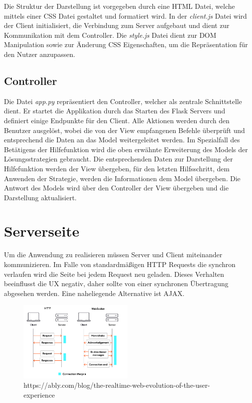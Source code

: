 Die Struktur der Darstellung ist vorgegeben durch eine \ac{HTML} Datei, welche mittels einer \ac{CSS} Datei gestaltet und formatiert wird. In der \textit{client.js} Datei wird der Client initialisiert, die Verbindung zum Server aufgebaut und dient zur Kommunikation mit dem Controller. Die \textit{style.js} Datei dient zur DOM Manipulation sowie zur Änderung \ac{CSS} Eigenschaften, um die Repräsentation für den Nutzer anzupassen.

\subsection{Controller}
Die Datei \textit{app.py} repräsentiert den Controller, welcher als zentrale Schnittstelle dient. Er startet die Applikation durch das Starten des Flask Servers und definiert einige Endpunkte für den Client. Alle Aktionen werden durch den Benutzer ausgelöst, wobei die von der View empfangenen Befehle überprüft und entsprechend die Daten an das Model weitergeleitet werden. Im Spezialfall des Betätigens der Hilfefunktion wird die oben erwähnte Erweiterung des Models der Lösungsstrategien gebraucht. Die entsprechenden Daten zur Darstellung der Hilfefunktion werden der View übergeben, für den letzten Hilfsschritt, dem Anwenden der Strategie, werden die Informationen dem Model übergeben. Die Antwort des Models wird über den Controller der View übergeben und die Darstellung aktualisiert. 

\section{Serverseite}

Um die Anwendung zu realisieren müssen Server und Client miteinander kommunizieren. Im Falle von standardmäßigen \ac{HTTP} Requests die synchron verlaufen wird die Seite bei jedem Request neu geladen. Dieses Verhalten beeinflusst die \ac{UX} negativ, daher sollte von einer synchronen Übertragung abgesehen werden. Eine naheliegende Alternative ist \ac{AJAX}. 

\begin{figure}[htbp]
	\centering
	\includegraphics[width=0.5\textwidth]{images/Websocket.png}
	\caption{https://ably.com/blog/the-realtime-web-evolution-of-the-user-experience}
	\label{fig:VergleichWeb}
\end{figure}

